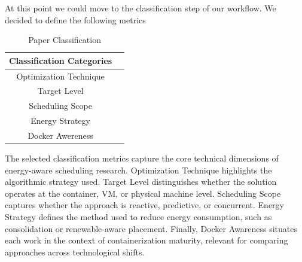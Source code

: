\begin{multicols}{2}
At this point we could move to the classification step of our workflow. We decided to define the following  metrics

\begin{table}[H]
\centering
\begin{tabular}{c c}
\hline
Classification Categories\\ \hline
Optimization Technique \\ 
Target Level  \\ 
Scheduling Scope \\ 
Energy Strategy \\
Docker Awereness \\
\hline
\end{tabular}
    \caption{Paper Classification}
    \label{tab:Paper Classification}
\end{table}

The selected classification metrics capture the core technical dimensions of energy-aware scheduling research. Optimization Technique highlights the algorithmic strategy used. Target Level distinguishes whether the solution operates at the container, VM, or physical machine level. Scheduling Scope captures whether the approach is reactive, predictive, or concurrent. Energy Strategy defines the method used to reduce energy consumption, such as consolidation or renewable-aware placement. Finally, Docker Awareness situates each work in the context of containerization maturity, relevant for comparing approaches across technological shifts.

\end{multicols}

